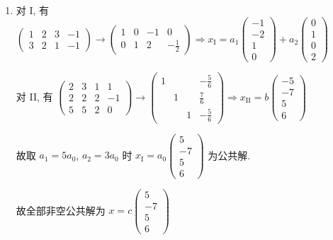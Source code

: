 	 \paragraph{} %
		 \begin{enumerate}
			 \item %
			       对 I, 有 \( \begin{pmatrix}
				       1 & 2 & 3 & -1 \\
				       3 & 2 & 1 & -1
			       \end{pmatrix} \rightarrow \begin{pmatrix}
				       1 & 0 & -1 & 0            \\
				       0 & 1 & 2  & -\frac{1}{2}
			       \end{pmatrix} \Rightarrow x_{\text{I}} = a_{1}\begin{pmatrix}
				       -1 \\
				       -2 \\
				       1  \\
				       0
			       \end{pmatrix} + a_{2}\begin{pmatrix}
				       0 \\
				       1 \\
				       0 \\
				       2
			       \end{pmatrix} \)

			       对 II, 有 \( \begin{pmatrix}
				       2 & 3 & 1 & 1  \\
				       2 & 2 & 2 & -1 \\
				       5 & 5 & 2 & 0
			       \end{pmatrix} \rightarrow \begin{pmatrix}
				       1 &   &   & -\frac{5}{6} \\
				         & 1 &   & \frac{7}{6}  \\
				         &   & 1 & -\frac{5}{6}
			       \end{pmatrix} \Rightarrow x_{\text{II}} = b\begin{pmatrix}
				       -5 \\
				       -7 \\
				       5  \\
				       6
			       \end{pmatrix} \)

			       故取 \( a_{1} = 5a_{0} \), \( a_{2} = 3a_{0} \) 时 \( x_{\text{I}} = a_{0}\begin{pmatrix}
				       5  \\
				       -7 \\
				       5  \\
				       6
			       \end{pmatrix} \) 为公共解.

			       故全部非空公共解为 \( x = c\begin{pmatrix}
				       5  \\
				       -7 \\
				       5  \\
				       6
			       \end{pmatrix} \)
		 \end{enumerate}


